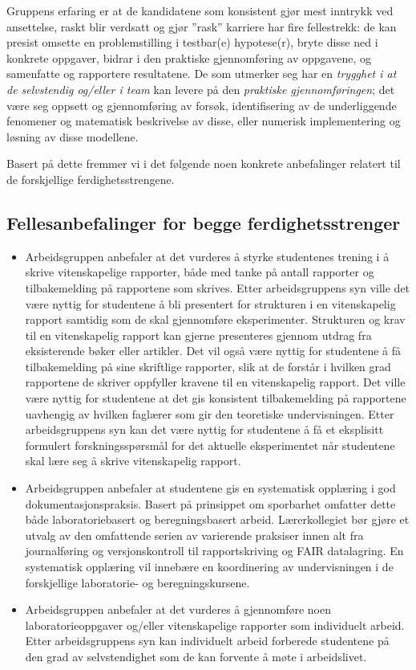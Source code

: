\documentclass{article}
\begin{document}
Gruppens erfaring er at de kandidatene som konsistent gjør mest inntrykk ved ansettelse, raskt blir verdsatt og gjør ''rask'' karriere har fire fellestrekk: de kan presist omsette en problemstilling i  testbar(e) hypotese(r), bryte disse ned i konkrete oppgaver, bidrar i den praktiske gjennomføring av oppgavene, og samenfatte og rapportere resultatene. De som utmerker seg har en \emph{trygghet i at de selvstendig og/eller i team} kan levere på den \emph{praktiske gjennomføringen}; det være seg oppsett og gjennomføring av forsøk, identifisering av de underliggende fenomener og matematisk beskrivelse av disse, eller numerisk implementering og løsning av disse modellene.  

Basert på dette fremmer vi i det følgende noen konkrete anbefalinger relatert til de forskjellige ferdighetsstrengene.

\subsection{Fellesanbefalinger for begge ferdighetsstrenger}
\begin{itemize}
  \item Arbeidsgruppen anbefaler at det vurderes å styrke studentenes trening i å skrive vitenskapelige rapporter, både med tanke på antall rapporter og tilbakemelding på rapportene som skrives. Etter arbeidsgruppens syn ville det være nyttig for studentene å bli presentert for strukturen i en vitenskapelig rapport samtidig som de skal gjennomføre eksperimenter. Strukturen og krav til en vitenskapelig rapport kan gjerne presenteres gjennom utdrag fra eksisterende bøker eller artikler. Det vil også være nyttig for studentene å få tilbakemelding på sine skriftlige rapporter, slik at de forstår i hvilken grad rapportene de skriver oppfyller kravene til en vitenskapelig rapport. Det ville være nyttig for studentene at det gis konsistent tilbakemelding på rapportene uavhengig av hvilken faglærer som gir den teoretiske undervisningen. Etter arbeidsgruppens syn kan det være nyttig for studentene å få et eksplisitt formulert forskningsspørsmål for det aktuelle eksperimentet når studentene skal lære seg å skrive vitenskapelig rapport.

  \item Arbeidsgruppen anbefaler at studentene gis en systematisk opplæring i god dokumentasjonspraksis. Basert på prinsippet om sporbarhet omfatter dette både laboratoriebasert og beregningsbasert arbeid. Lærerkollegiet bør gjøre et utvalg av den omfattende serien av varierende praksiser innen alt fra journalføring og versjonskontroll til rapportskriving og FAIR datalagring. En systematisk opplæring vil innebære en koordinering av undervisningen i de forskjellige laboratorie- og beregningskursene.

  \item Arbeidsgruppen anbefaler at det vurderes å gjennomføre noen laboratorieoppgaver og/eller vitenskapelige rapporter som individuelt arbeid. Etter arbeidsgruppens syn kan individuelt arbeid forberede studentene på den grad av selvstendighet som de kan forvente å møte i arbeidslivet.
\end{itemize}
\end{document}
